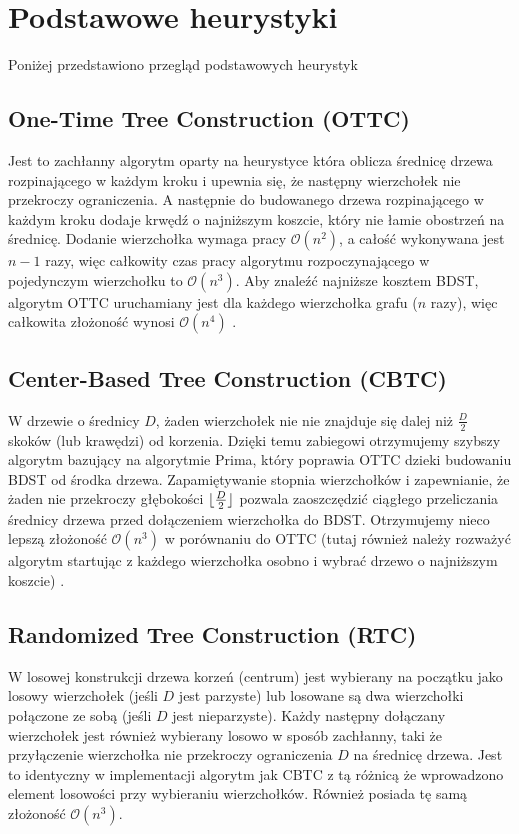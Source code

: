 \section{Podstawowe heurystyki}
Poniżej przedstawiono przegląd podstawowych heurystyk

\subsection{One-Time Tree Construction (OTTC)}

Jest to zachłanny algorytm oparty na heurystyce która oblicza średnicę drzewa rozpinającego w każdym kroku i upewnia się, że następny wierzchołek nie przekroczy ograniczenia. A następnie do budowanego drzewa rozpinającego w każdym kroku dodaje krwędź o najniższym koszcie, który nie łamie obostrzeń na średnicę. Dodanie wierzchołka wymaga pracy $\mathcal{O}(n^2)$, a całość wykonywana jest $n-1$ razy, więc całkowity czas pracy algorytmu rozpoczynającego w pojedynczym wierzchołku to $\mathcal{O}(n^3)$. Aby znaleźć najniższe kosztem BDST, algorytm OTTC uruchamiany jest dla każdego wierzchołka grafu ($n$ razy), więc całkowita złożoność wynosi $\mathcal{O}(n^4)$ \cite{DBLP:conf/ciac/DeoA00}.

\subsection{Center-Based Tree Construction (CBTC)}
W drzewie o średnicy $D$, żaden wierzchołek nie nie znajduje się dalej niż $\frac{D}{2}$ skoków (lub krawędzi) od korzenia. Dzięki temu zabiegowi otrzymujemy szybszy algorytm bazujący na algorytmie Prima, który poprawia OTTC dzieki budowaniu BDST od środka drzewa. Zapamiętywanie stopnia wierzchołków i zapewnianie, że żaden nie przekroczy głębokości $\lfloor\frac{D}{2}\rfloor$ pozwala zaoszczędzić ciągłego przeliczania średnicy drzewa przed dołączeniem wierzchołka do BDST. Otrzymujemy nieco lepszą złożoność $\mathcal{O}(n^3)$ w porównaniu do OTTC (tutaj również należy rozważyć algorytm startując z każdego wierzchołka osobno i wybrać drzewo o najniższym koszcie) \cite{DBLP:journals/jea/Julstrom09}.

\subsection{Randomized Tree Construction (RTC)}
W losowej konstrukcji drzewa korzeń (centrum) jest wybierany na początku jako losowy wierzchołek (jeśli $D$ jest parzyste) lub losowane są dwa wierzchołki połączone ze sobą (jeśli $D$ jest nieparzyste). Każdy następny dołączany wierzchołek jest również wybierany losowo w sposób zachłanny, taki że przyłączenie wierzchołka nie przekroczy ograniczenia $D$ na średnicę drzewa. Jest to identyczny w implementacji algorytm jak CBTC z tą różnicą że wprowadzono element losowości przy wybieraniu wierzchołków. Również posiada tę samą złożoność $\mathcal{O}(n^3)$.

